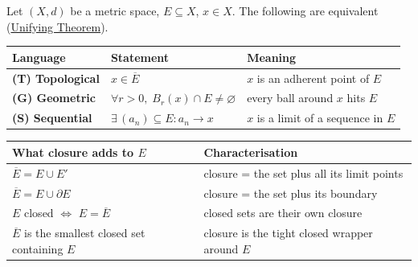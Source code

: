 \bigskip


\begin{tcolorbox}[colback=gray!6, colframe=gray!40, arc=2pt,
  left=8pt, right=8pt, top=6pt, bottom=6pt,
  title={\small\textbf{Part IV \enspace Closure — Three Languages}},
  fonttitle=\small\bfseries]
\small
Let $(X,d)$ be a metric space, $E \subseteq X$, $x \in X$.
The following are equivalent \textnormal{(\hyperref[thm:closure-three-way-unifying]{Unifying Theorem})}.
\renewcommand{\arraystretch}{1.55}
\begin{tabular}{p{2.2cm} p{4.8cm} p{5.4cm}}
\toprule
\textbf{Language} & \textbf{Statement} & \textbf{Meaning} \\
\midrule

\textbf{(T) Topological}
  & $x \in \overline{E}$
  & $x$ is an adherent point of $E$ \\[2pt]

\textbf{(G) Geometric}
  & $\forall r > 0,\; B_r(x) \cap E \neq \varnothing$
  & every ball around $x$ hits $E$ \\[2pt]

\textbf{(S) Sequential}
  & $\exists\, (a_n) \subseteq E : a_n \to x$
  & $x$ is a limit of a sequence in $E$ \\[2pt]

\bottomrule
\end{tabular}

\medskip
\begin{tabular}{p{6cm} p{6.5cm}}
\toprule
\textbf{What closure adds to $E$} & \textbf{Characterisation} \\
\midrule
$\overline{E} = E \cup E'$
  & closure = the set plus all its limit points \\[2pt]
$\overline{E} = E \cup \partial E$
  & closure = the set plus its boundary \\[2pt]
$E$ closed $\iff$ $E = \overline{E}$
  & closed sets are their own closure \\[2pt]
$\overline{E}$ is the smallest closed set containing $E$
  & closure is the tight closed wrapper around $E$ \\[2pt]
\bottomrule
\end{tabular}
\end{tcolorbox}

\bigskip


